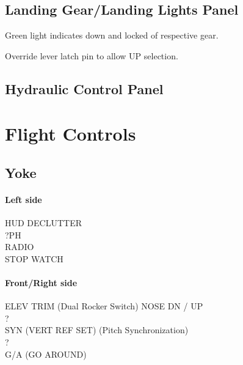 \subsection{Landing Gear/Landing Lights Panel}

\begin{enumerate}
    \begin{itemize}
    \end{itemize}
   Green light indicates down and locked of respective gear.
    \begin{itemize}
    \end{itemize}
   Override lever latch pin to allow UP selection.
\end{enumerate}

\subsection{Hydraulic Control Panel}

\section{Flight Controls}

\subsection{Yoke}

\paragraph*{Left side}
HUD DECLUTTER\\
?PH\\
RADIO\\
STOP WATCH

\paragraph*{Front/Right side}
ELEV TRIM (Dual Rocker Switch) NOSE DN / UP\\
?\\
SYN (VERT REF SET) (Pitch Synchronization)\\
?\\
G/A (GO AROUND)

